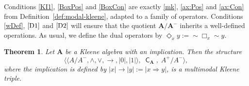 \documentclass[10pt,a4paper]{amsart}
\newtheorem{theorem}{Theorem}[section]
\DeclareMathOperator{\con}{\mathsf{C}}
\newcommand{\A}{\mathbf{A}}
\begin{document}
Conditions \eqref{KI1}, \eqref{BoxPos} and \eqref{BoxCon} are exactly \eqref{mk}, \eqref{ax:Pos} and \eqref{ax:Con} from
Definition~\ref{def:modal-kleene}, adapted to a family of operators. Conditions \eqref{wDef}, $\eqref{D1}$ and $\eqref{D2}$ will
ensure that the quotient $\A/\A^{-}$ inherits a well-defined operations. As usual, we define the dual
operators by $\Diamond_x y := \sim \Box_x \sim y$.

\begin{theorem}
\label{thm:quotient-DLI3}
Let $\A$ be a Kleene algebra with an implication. Then the structure
\[
    \big\langle \langle A/A^{-},\wedge,\vee,\to,|0|,|1|\rangle,\; \con_{\mathbf{A}},\; A^{+}/A^{-} \big\rangle,
\]
where the implication is defined by $|x| \to |y| := |x\Rightarrow y|$, is a multimodal Kleene triple.
\end{theorem}
\end{document}
